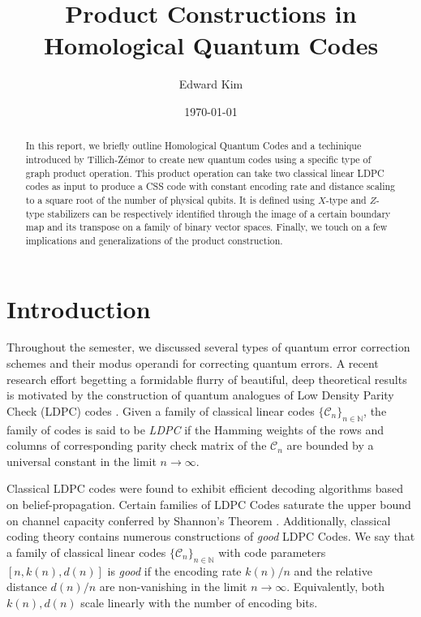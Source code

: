 \documentclass[12pt]{article}%
\theoremstyle{definition}
\begin{document}
\title{Product Constructions in Homological Quantum Codes}
\author{Edward Kim}
\date{\today}
\maketitle

\begin{abstract}
In this report, we briefly outline Homological Quantum Codes and a techinique introduced by Tillich-Z\'emor to create new quantum codes using a specific type of graph product operation. This product operation can take two classical linear LDPC codes as input to produce a CSS code with constant encoding rate and distance scaling to a square root of the number of physical qubits. It is defined using $X$-type and $Z$-type stabilizers can be respectively identified through the image of a certain boundary map and its transpose on a family of binary vector spaces. Finally, we touch on a few implications and generalizations of the product construction.
\end{abstract}

\section{Introduction}

\hspace{\parindent}Throughout the semester, we discussed several types of quantum error correction schemes and their modus operandi for correcting quantum errors. A recent research effort begetting a formidable flurry of beautiful, deep theoretical results is motivated by the construction of quantum analogues of Low Density Parity Check (LDPC) codes \cite{breuckmann2021quantum}. Given a family of classical linear codes $\{\mathcal{C}_n\}_{n \in \mathbb{N}}$, the family of codes is said to be \emph{LDPC} if the Hamming weights of the rows and columns of corresponding parity check matrix of the $\mathcal{C}_n$ are bounded by a universal constant in the limit $n \rightarrow \infty$. 

Classical LDPC codes were found to exhibit efficient decoding algorithms based on belief-propagation. Certain families of LDPC Codes saturate the upper bound on channel capacity conferred by Shannon's Theorem \cite{gallager1962low, mackay1999good}. Additionally, classical coding theory contains numerous constructions of \emph{good} LDPC Codes. We say that a family of classical linear codes  $\{\mathcal{C}_n\}_{n \in \mathbb{N}}$ with code parameters $[n,k(n),d(n)]$ is \emph{good} if the encoding rate $k(n) / n $ and the relative distance $d(n) / n$ are non-vanishing in the limit $n \rightarrow \infty$. Equivalently, both $k(n), d(n)$ scale linearly with the number of encoding bits. 
\end{document}
